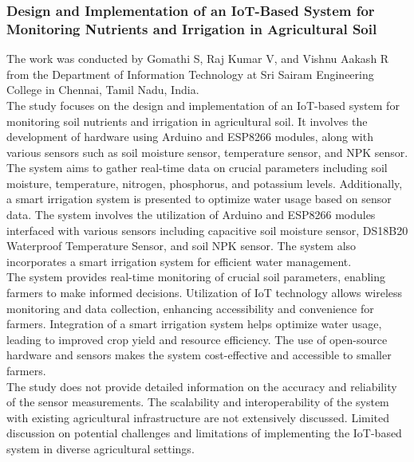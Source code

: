 \documentclass[12pt, a4paper]{article}
\begin{document}
\subsubsection{Design and Implementation of an IoT-Based System for Monitoring Nutrients and Irrigation in Agricultural Soil}
The work was conducted by Gomathi S, Raj Kumar V, and Vishnu Aakash R \cite{gomathi2022design} from the Department of Information Technology at Sri Sairam Engineering College in Chennai, Tamil Nadu, India.\\
The study focuses on the design and implementation of an IoT-based system for monitoring soil nutrients and irrigation in agricultural soil. It involves the development of hardware using Arduino and ESP8266 modules, along with various sensors such as soil moisture sensor, temperature sensor, and NPK sensor. The system aims to gather real-time data on crucial parameters including soil moisture, temperature, nitrogen, phosphorus, and potassium levels. Additionally, a smart irrigation system is presented to optimize water usage based on sensor data. The system involves the utilization of Arduino and ESP8266 modules interfaced with various sensors including capacitive soil moisture sensor, DS18B20 Waterproof Temperature Sensor, and soil NPK sensor. The system also incorporates a smart irrigation system for efficient water management.\\ The system provides real-time monitoring of crucial soil parameters, enabling farmers to make informed decisions. Utilization of IoT technology allows wireless monitoring and data collection, enhancing accessibility and convenience for farmers. Integration of a smart irrigation system helps optimize water usage, leading to improved crop yield and resource efficiency. The use of open-source hardware and sensors makes the system cost-effective and accessible to smaller farmers.\\
The study does not provide detailed information on the accuracy and reliability of the sensor measurements. The scalability and interoperability of the system with existing agricultural infrastructure are not extensively discussed. Limited discussion on potential challenges and limitations of implementing the IoT-based system in diverse agricultural settings.
\end{document}

